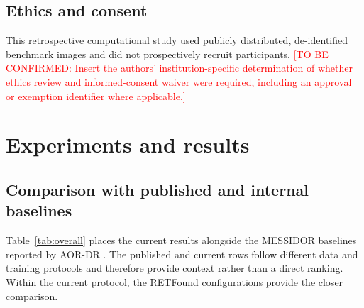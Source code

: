 \documentclass[a4paper,fleqn]{cas-sc}
\newcommand{\tbc}[1]{\textcolor{red}{[TO BE CONFIRMED: #1]}}
\begin{document}
\subsection{Ethics and consent}

This retrospective computational study used publicly distributed, de-identified benchmark images and did not prospectively recruit participants. \tbc{Insert the authors' institution-specific determination of whether ethics review and informed-consent waiver were required, including an approval or exemption identifier where applicable.}

\section{Experiments and results}
\label{sec:results}

\subsection{Comparison with published and internal baselines}

Table~\ref{tab:overall} places the current results alongside the MESSIDOR baselines reported by AOR-DR \citep{yu2025aordr}. The published and current rows follow different data and training protocols and therefore provide context rather than a direct ranking. Within the current protocol, the RETFound configurations provide the closer comparison.
\end{document}
